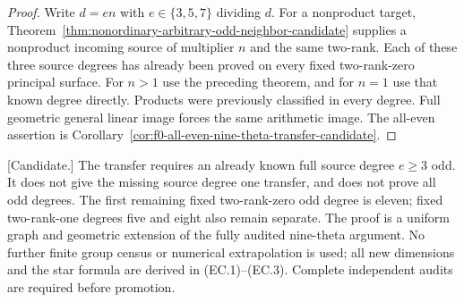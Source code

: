 \begin{proof}
Write $d=en$ with $e\in\{3,5,7\}$ dividing $d$. For a nonproduct
target, Theorem~\ref{thm:nonordinary-arbitrary-odd-neighbor-candidate}
supplies a nonproduct incoming source of multiplier $n$ and the
same two-rank. Each of these three source degrees has already
been proved on every fixed two-rank-zero principal surface.
For $n>1$ use the preceding theorem, and for $n=1$ use that known
degree directly. Products were previously classified in every
degree. Full geometric general linear image forces the same
arithmetic image. The all-even assertion is
Corollary~\ref{cor:f0-all-even-nine-theta-transfer-candidate}.
\end{proof}

\begin{remark}
\label{rem:cubic-component-norm-transfer-scope-candidate}
\textup{[Candidate.]}
The transfer requires an already known full source degree
$e\ge3$ odd. It does not give the missing source degree one
transfer, and does not prove all odd degrees. The first remaining
fixed two-rank-zero odd degree is eleven; fixed two-rank-one
degrees five and eight also remain separate. The proof is a
uniform graph and geometric extension of the fully audited
nine-theta argument. No further finite group census or numerical
extrapolation is used; all new dimensions and the star formula
are derived in (EC.1)--(EC.3). Complete independent audits are
required before promotion.
\end{remark}
